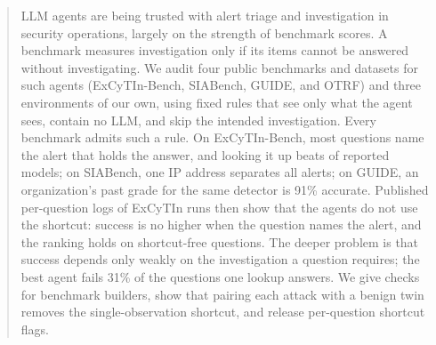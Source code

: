 \begin{abstract}
LLM agents are being trusted with alert triage and investigation in security operations, largely on the strength of benchmark scores. A benchmark measures investigation only if its items cannot be answered without investigating. We audit four public benchmarks and datasets for such agents (ExCyTIn-Bench, SIABench, GUIDE, and OTRF) and three environments of our own, using fixed rules that see only what the agent sees, contain no LLM, and skip the intended investigation. Every benchmark admits such a rule. On ExCyTIn-Bench, most questions name the alert that holds the answer, and looking it up beats \oBelowGraph{} of \oModels{} reported models; on SIABench, one IP address separates all \siaN{} alerts; on GUIDE, an organization's past grade for the same detector is 91\% accurate. Published per-question logs of \lgModels{} ExCyTIn runs then show that the agents do not use the shortcut: success is no higher when the question names the alert, and the ranking holds on shortcut-free questions. The deeper problem is that success depends only weakly on the investigation a question requires; the best agent fails 31\% of the questions one lookup answers. We give checks for benchmark builders, show that pairing each attack with a benign twin removes the single-observation shortcut, and release per-question shortcut flags.
\end{abstract}
